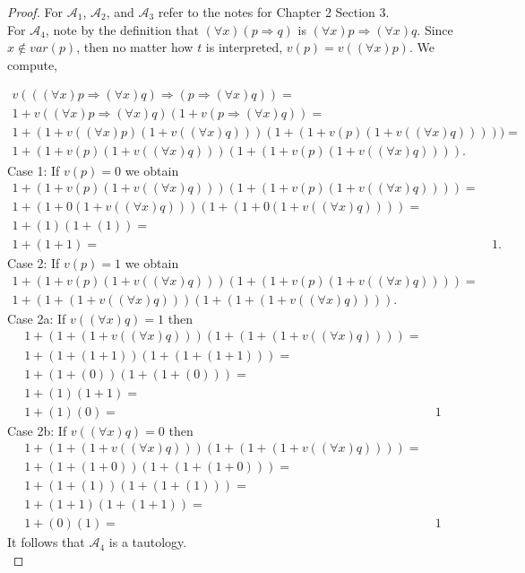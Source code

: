 \documentclass{article}
\theoremstyle{problemstyle}
\theoremstyle{lemmastyle}
\theoremstyle{theoremstyle}
\theoremstyle{problemstyle}
\begin{document}
\begin{proof}
For $\mathscr{A}_1$, $\mathscr{A}_2$, and $\mathscr{A}_3$ refer to the notes for Chapter 2 Section 3.\\

For $\mathscr{A}_4$, note by the definition that $(\forall x)(p\Rightarrow q)$ is $(\forall x)p\Rightarrow (\forall x)q$. Since $x \notin var(p)$, then no matter how $t$ is interpreted, $v(p) = v((\forall x)p)$. We compute, 

\begin{align*}
v(((\forall x)p\Rightarrow (\forall x)q)\Rightarrow (p \Rightarrow (\forall x) q)) =&  \\ 
1+v((\forall x)p\Rightarrow (\forall x)q)(1+v(p \Rightarrow (\forall x) q))  =&\\
1+(1+v((\forall x)p)(1+v((\forall x)q)))(1+(1+v(p)(1+v((\forall x) q)))))  =& \\
1+(1+v(p)(1+v((\forall x)q)))(1+(1+v(p)(1+v((\forall x) q)))). 
\end{align*}
Case 1: If $v(p) = 0$ we obtain 
\begin{align*}
1+(1+v(p)(1+v((\forall x)q)))(1+(1+v(p)(1+v((\forall x) q)))) =& \\
1+(1+0(1+v((\forall x)q)))(1+(1+0(1+v((\forall x) q)))) =& \\
1+(1)(1+(1)) =& \\
1+(1+1) =& \  1.
\end{align*}
Case 2: If $v(p) = 1$ we obtain 
\begin{align*}
1+(1+v(p)(1+v((\forall x)q)))(1+(1+v(p)(1+v((\forall x) q)))) =& \\
1+(1+(1+v((\forall x)q)))(1+(1+(1+v((\forall x) q)))).   \ \ & 
\end{align*}
Case 2a: If $v((\forall x)q) = 1$ then 
\begin{align*}
1+(1+(1+v((\forall x)q)))(1+(1+(1+v((\forall x) q)))) =& \\
1+(1+(1+1))(1+(1+(1+1))) =& \\
1+(1+(0))(1+(1+(0))) =& \\
1+(1)(1+1) =& \\
1+(1)(0) =& \ 1 
\end{align*}
Case 2b: If $v((\forall x)q) = 0$ then 
\begin{align*}
1+(1+(1+v((\forall x)q)))(1+(1+(1+v((\forall x) q)))) =& \\
1+(1+(1+0))(1+(1+(1+0))) =& \\
1+(1+(1))(1+(1+(1))) =& \\
1+(1+1)(1+(1+1)) =& \\
1+(0)(1) =& \ 1 
\end{align*}
It follows that $\mathscr{A}_4$ is a tautology. \\


\end{proof}
\end{document}
